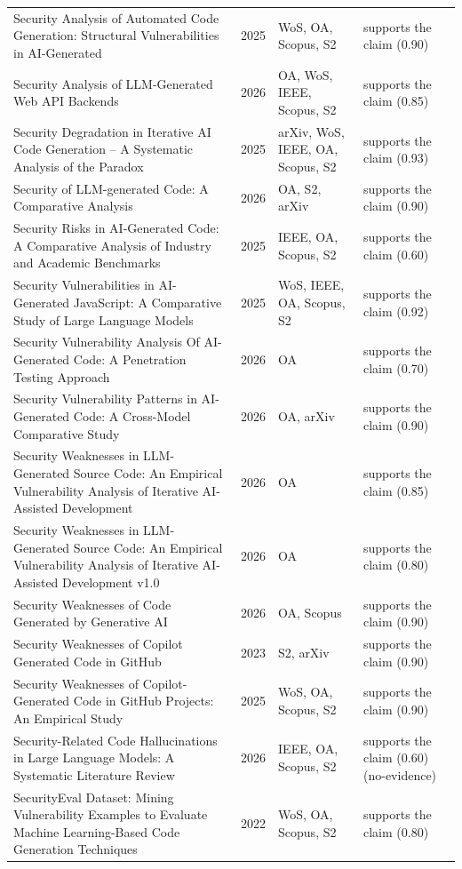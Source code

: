 \begin{longtable}{@{}%
  >{\raggedright\arraybackslash}p{}c%
  >{\raggedright\arraybackslash}p{}%
  >{\raggedright\arraybackslash}p{}@{}}
Security Analysis of Automated Code Generation: Structural Vulnerabilities in AI-Generated & 2025 & WoS, OA, Scopus, S2 & supports the claim (0.90) \\
Security Analysis of LLM-Generated Web API Backends & 2026 & OA, WoS, IEEE, Scopus, S2 & supports the claim (0.85) \\
Security Degradation in Iterative AI Code Generation -- A Systematic Analysis of the Paradox & 2025 & arXiv, WoS, IEEE, OA, Scopus, S2 & supports the claim (0.93) \\
Security of LLM-generated Code: A Comparative Analysis & 2026 & OA, S2, arXiv & supports the claim (0.90) \\
Security Risks in AI-Generated Code: A Comparative Analysis of Industry and Academic Benchmarks & 2025 & IEEE, OA, Scopus, S2 & supports the claim (0.60) \\
Security Vulnerabilities in AI-Generated JavaScript: A Comparative Study of Large Language Models & 2025 & WoS, IEEE, OA, Scopus, S2 & supports the claim (0.92) \\
Security Vulnerability Analysis Of AI-Generated Code: A Penetration Testing Approach & 2026 & OA & supports the claim (0.70) \\
Security Vulnerability Patterns in AI-Generated Code: A Cross-Model Comparative Study & 2026 & OA, arXiv & supports the claim (0.90) \\
Security Weaknesses in LLM-Generated Source Code: An Empirical Vulnerability Analysis of Iterative AI-Assisted Development & 2026 & OA & supports the claim (0.85) \\
Security Weaknesses in LLM-Generated Source Code: An Empirical Vulnerability Analysis of Iterative AI-Assisted Development v1.0 & 2026 & OA & supports the claim (0.80) \\
Security Weaknesses of Code Generated by Generative AI & 2026 & OA, Scopus & supports the claim (0.90) \\
Security Weaknesses of Copilot Generated Code in GitHub & 2023 & S2, arXiv & supports the claim (0.90) \\
Security Weaknesses of Copilot-Generated Code in GitHub Projects: An Empirical Study & 2025 & WoS, OA, Scopus, S2 & supports the claim (0.90) \\
Security-Related Code Hallucinations in Large Language Models: A Systematic Literature Review & 2026 & IEEE, OA, Scopus, S2 & supports the claim (0.60) (no-evidence) \\
SecurityEval Dataset: Mining Vulnerability Examples to Evaluate Machine Learning-Based Code Generation Techniques & 2022 & WoS, OA, Scopus, S2 & supports the claim (0.80) \\

\end{longtable}

